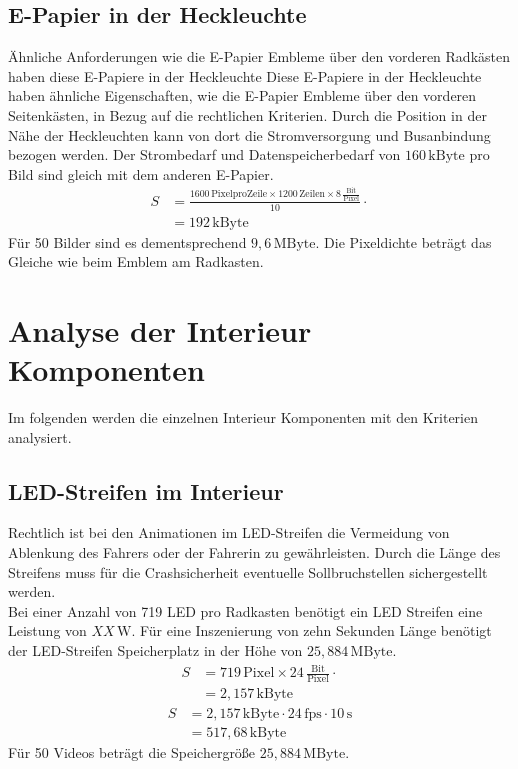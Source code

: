 \subsection{E-Papier in der Heckleuchte}
Ähnliche Anforderungen wie die E-Papier Embleme über den vorderen Radkästen haben diese E-Papiere in der Heckleuchte
Diese E-Papiere in der Heckleuchte haben ähnliche Eigenschaften, wie die E-Papier Embleme über den vorderen Seitenkästen, in Bezug auf die rechtlichen Kriterien. Durch die Position in der Nähe der Heckleuchten kann von dort die Stromversorgung und Busanbindung bezogen werden. Der Strombedarf und Datenspeicherbedarf von $ 160\,\mathrm{kByte} $ pro Bild sind gleich mit dem anderen E-Papier. 
\begin{align}
	S &= \frac{1600\,\mathrm{Pixel pro Zeile} \times 1200\,\mathrm{Zeilen} \times 8\,\frac{\mathrm{Bit}}{\mathrm{Pixel}}}{10} \cdot \\
	&= 192\,\mathrm{kByte}
\end{align}
Für 50 Bilder sind es dementsprechend $ 9,6\,\mathrm{MByte} $.
Die Pixeldichte beträgt das Gleiche wie beim Emblem am Radkasten.
\section{Analyse der Interieur Komponenten}
Im folgenden werden die einzelnen Interieur Komponenten mit den Kriterien analysiert.
\subsection{LED-Streifen im Interieur}
Rechtlich ist bei den Animationen im LED-Streifen die Vermeidung von Ablenkung des Fahrers oder der Fahrerin zu gewährleisten.
Durch die Länge des Streifens muss für die Crashsicherheit eventuelle Sollbruchstellen sichergestellt werden. \\
Bei einer Anzahl von 719 LED pro Radkasten benötigt ein LED Streifen eine Leistung von $ XX\,\mathrm{W} $.
Für eine Inszenierung von zehn Sekunden Länge benötigt der LED-Streifen Speicherplatz in der Höhe von $ 25,884\,\mathrm{MByte}$.
\begin{align}
	S &= 719\,\mathrm{Pixel} \times 24\,\frac{\mathrm{Bit}}{\mathrm{Pixel}} \cdot \\
	&= 2,157\,\mathrm{kByte}
\end{align}
\begin{align}
	S &= 2,157\,\mathrm{kByte} \cdot 24\,\mathrm{fps} \cdot 10\,\mathrm{s}\\
	&= 517,68\,\mathrm{kByte}
\end{align}
Für 50 Videos beträgt die Speichergröße $ 25,884\,\mathrm{MByte} $.
